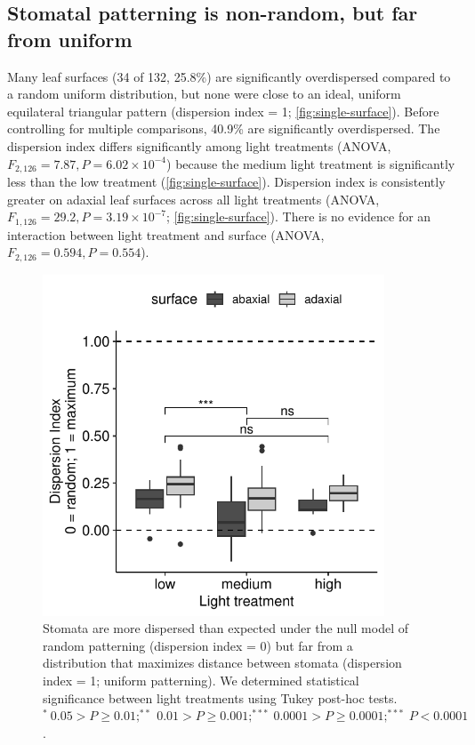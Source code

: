 \documentclass[webpdf,large,modern,unnumsec,namedate]{oup-authoring-template}
\begin{document}
\subsection{Stomatal patterning is non-random, but far from
uniform}\label{stomatal-patterning-is-non-random-but-far-from-uniform}

Many leaf surfaces (34 of 132, 25.8\%) are significantly overdispersed
compared to a random uniform distribution, but none were close to an
ideal, uniform equilateral triangular pattern (dispersion index = 1;
\autoref{fig:single-surface}). Before controlling for multiple
comparisons, 40.9\% are significantly overdispersed. The dispersion
index differs significantly among light treatments (ANOVA,
\(F_{2,126} = 7.87, P = 6.02 \times 10^{-4}\)) because the medium light
treatment is significantly less than the low treatment
(\autoref{fig:single-surface}). Dispersion index is consistently greater
on adaxial leaf surfaces across all light treatments (ANOVA,
\(F_{1,126} = 29.2, P = 3.19 \times 10^{-7}\);
\autoref{fig:single-surface}). There is no evidence for an interaction
between light treatment and surface (ANOVA,
\(F_{2,126} = 0.594, P = 0.554\)).

\begin{figure}[ht]
\includegraphics[width=4in]{figures/single-surface.pdf}
\caption{Stomata are more dispersed than expected under the null model of random patterning (dispersion index = 0) but far from a distribution that maximizes distance between stomata (dispersion index = 1; uniform patterning). We determined statistical significance between light treatments using Tukey post-hoc tests. $^*~0.05 > P \ge 0.01; ^{**}~0.01 > P \ge 0.001; ^{***}~0.0001 > P \ge 0.0001; ^{***}~ P <0.0001$.}
\label{fig:single-surface}
\end{figure}
\end{document}
